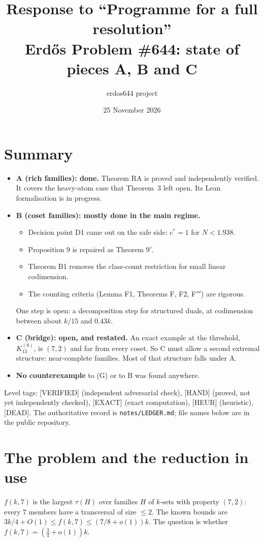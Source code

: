 \documentclass[11pt]{article}
\title{Response to ``Programme for a full resolution''\\[2pt]\large Erd\H{o}s Problem \#644: state of pieces A, B and C}
\author{erdos644 project}
\date{25 November 2026}
\newcommand{\lvl}[1]{\textsf{\small[#1]}}
\begin{document}
\maketitle

\section*{Summary}
\begin{itemize}
\item \textbf{A (rich families): done.} Theorem RA is proved and independently verified. It covers the heavy-atom case
that Theorem~3 left open. Its Lean formalisation is in progress.
\item \textbf{B (coset families): mostly done in the main regime.}
  \begin{itemize}
  \item Decision point D1 came out on the safe side: $c^*=1$ for $N<1.938$.
  \item Proposition 9 is repaired as Theorem $9'$.
  \item Theorem B1 removes the class-count restriction for small linear codimension.
  \item The counting criteria (Lemma F1, Theorems F, F2, F$'''$) are rigorous.
  \end{itemize}
  One step is open: a decomposition step for structured duals, at codimension between about $k/15$ and $0.43k$.
\item \textbf{C (bridge): open, and restated.} An exact example at the threshold, $K_{13}^{(8)}$, is $(7,2)$ and far from
every coset. So C must allow a second extremal structure: near-complete families. Most of that structure falls under A.
\item \textbf{No counterexample} to (G) or to B was found anywhere.
\end{itemize}
Level tags: \lvl{VERIFIED} (independent adversarial check), \lvl{HAND} (proved, not yet independently checked),
\lvl{EXACT} (exact computation), \lvl{HEUR} (heuristic), \lvl{DEAD}. The authoritative record is
\texttt{notes/LEDGER.md}; file names below are in the public repository.

\section{The problem and the reduction in use}
$f(k,7)$ is the largest $\tau(H)$ over families $H$ of $k$-sets with property $(7,2)$: every 7 members have a transversal
of size $\le2$. The known bounds are $3k/4+O(1)\le f(k,7)\le(7/8+o(1))k$. The question is whether
$f(k,7)=(\tfrac34+o(1))k$.
\end{document}
